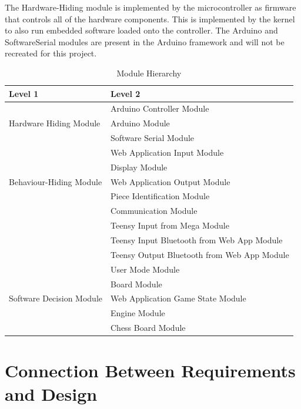 \documentclass[12pt, titlepage]{article}
\begin{document}
The Hardware-Hiding module is implemented by the microcontroller as firmware that controls all of the hardware components. This is implemented by the kernel to also run embedded software loaded onto the controller. The Arduino and SoftwareSerial modules are present in the Arduino framework and will not be recreated for this project.


\begin{table}[h!]
\centering
\begin{tabular}{p{} p{}}
\toprule
\textbf{Level 1} & \textbf{Level 2}\\
\midrule

\multirow{3}{0.3\textwidth}{Hardware Hiding Module}
& Arduino Controller Module \\ 
& Arduino Module \\
& Software Serial Module \\
\midrule

\multirow{5}{0.3\textwidth}{Behaviour-Hiding Module} 
& Web Application Input Module\\
& Display Module\\
& Web Application Output Module\\
& Piece Identification Module \\
& Communication Module\\
& Teensy Input from Mega Module\\
& Teensy Input Bluetooth from Web App Module\\
& Teensy Output Bluetooth from Web App Module\\
\midrule

\multirow{5}{0.3\textwidth}{Software Decision Module} 
& User Mode Module\\
& Board Module\\
& Web Application Game State Module\\
& Engine Module\\
& Chess Board Module\\
\bottomrule

\end{tabular}
\caption{Module Hierarchy}
\label{TblMH}
\end{table}

\section{Connection Between Requirements and Design} \label{SecConnection}
\end{document}
